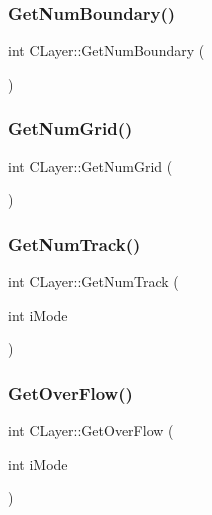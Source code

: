 \subsubsection{\texorpdfstring{GetNumBoundary()}{GetNumBoundary()}}
{\footnotesize\ttfamily int C\+Layer\+::\+Get\+Num\+Boundary (\begin{DoxyParamCaption}{ }\end{DoxyParamCaption})}

\mbox{\label{classCLayer_a94c6bfa99e46d919a415b00fd80964b3}} 
\subsubsection{\texorpdfstring{GetNumGrid()}{GetNumGrid()}}
{\footnotesize\ttfamily int C\+Layer\+::\+Get\+Num\+Grid (\begin{DoxyParamCaption}{ }\end{DoxyParamCaption})}

\mbox{\label{classCLayer_a157ea79e4063c434c0c3df09dc9fd8cc}} 
\subsubsection{\texorpdfstring{GetNumTrack()}{GetNumTrack()}}
{\footnotesize\ttfamily int C\+Layer\+::\+Get\+Num\+Track (\begin{DoxyParamCaption}\item[{int}]{i\+Mode }\end{DoxyParamCaption})}

\mbox{\label{classCLayer_aef7ab8aa370e9133096e2a66788b7ead}} 
\subsubsection{\texorpdfstring{GetOverFlow()}{GetOverFlow()}}
{\footnotesize\ttfamily int C\+Layer\+::\+Get\+Over\+Flow (\begin{DoxyParamCaption}\item[{int}]{i\+Mode }\end{DoxyParamCaption})}

\mbox{\label{classCLayer_aae29339458f6708296c4c05a36924760}} 
